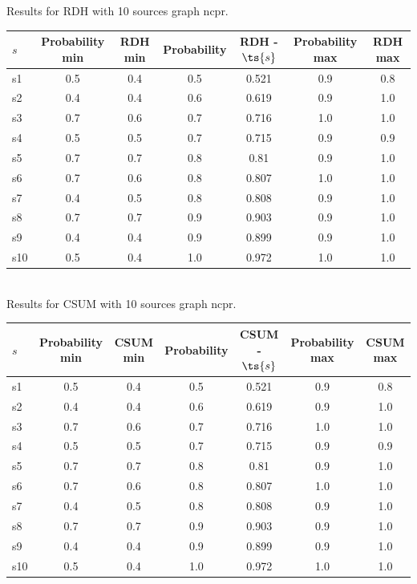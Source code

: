 \documentclass{article}
\begin{document}
\noindent Results for RDH with 10 sources graph ncpr.

\noindent\begin{tabular}{|l|c|c|c|c|c|c|}
\hline
$s$& Probability min & RDH min & Probability & RDH - $\ts{s}$ & Probability max & RDH max\\
\hline
s1 &0.5 & 0.4 & 0.5 & 0.521 & 0.9 & 0.8\\
\hline
s2 &0.4 & 0.4 & 0.6 & 0.619 & 0.9 & 1.0\\
\hline
s3 &0.7 & 0.6 & 0.7 & 0.716 & 1.0 & 1.0\\
\hline
s4 &0.5 & 0.5 & 0.7 & 0.715 & 0.9 & 0.9\\
\hline
s5 &0.7 & 0.7 & 0.8 & 0.81 & 0.9 & 1.0\\
\hline
s6 &0.7 & 0.6 & 0.8 & 0.807 & 1.0 & 1.0\\
\hline
s7 &0.4 & 0.5 & 0.8 & 0.808 & 0.9 & 1.0\\
\hline
s8 &0.7 & 0.7 & 0.9 & 0.903 & 0.9 & 1.0\\
\hline
s9 &0.4 & 0.4 & 0.9 & 0.899 & 0.9 & 1.0\\
\hline
s10 &0.5 & 0.4 & 1.0 & 0.972 & 1.0 & 1.0\\
\hline
\end{tabular}\\

\noindent Results for CSUM with 10 sources graph ncpr.

\noindent\begin{tabular}{|l|c|c|c|c|c|c|}
\hline
$s$& Probability min & CSUM min & Probability & CSUM - $\ts{s}$ & Probability max & CSUM max\\
\hline
s1 &0.5 & 0.4 & 0.5 & 0.521 & 0.9 & 0.8\\
\hline
s2 &0.4 & 0.4 & 0.6 & 0.619 & 0.9 & 1.0\\
\hline
s3 &0.7 & 0.6 & 0.7 & 0.716 & 1.0 & 1.0\\
\hline
s4 &0.5 & 0.5 & 0.7 & 0.715 & 0.9 & 0.9\\
\hline
s5 &0.7 & 0.7 & 0.8 & 0.81 & 0.9 & 1.0\\
\hline
s6 &0.7 & 0.6 & 0.8 & 0.807 & 1.0 & 1.0\\
\hline
s7 &0.4 & 0.5 & 0.8 & 0.808 & 0.9 & 1.0\\
\hline
s8 &0.7 & 0.7 & 0.9 & 0.903 & 0.9 & 1.0\\
\hline
s9 &0.4 & 0.4 & 0.9 & 0.899 & 0.9 & 1.0\\
\hline
s10 &0.5 & 0.4 & 1.0 & 0.972 & 1.0 & 1.0\\
\hline
\end{tabular}\\
\end{document}
